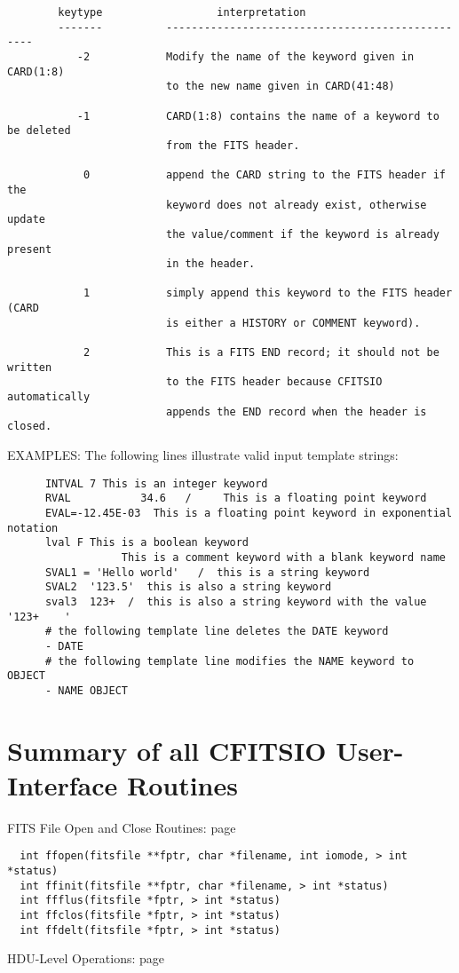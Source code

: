 \begin{verbatim}
        keytype                  interpretation
        -------          -------------------------------------------------
           -2            Modify the name of the keyword given in CARD(1:8)
                         to the new name given in CARD(41:48)

           -1            CARD(1:8) contains the name of a keyword to be deleted
                         from the FITS header.

            0            append the CARD string to the FITS header if the
                         keyword does not already exist, otherwise update
                         the value/comment if the keyword is already present
                         in the header.

            1            simply append this keyword to the FITS header (CARD
                         is either a HISTORY or COMMENT keyword).

            2            This is a FITS END record; it should not be written
                         to the FITS header because CFITSIO automatically
                         appends the END record when the header is closed.
\end{verbatim}
     EXAMPLES:  The following lines illustrate valid input template strings:

\begin{verbatim}
      INTVAL 7 This is an integer keyword
      RVAL           34.6   /     This is a floating point keyword
      EVAL=-12.45E-03  This is a floating point keyword in exponential notation
      lval F This is a boolean keyword
                  This is a comment keyword with a blank keyword name
      SVAL1 = 'Hello world'   /  this is a string keyword
      SVAL2  '123.5'  this is also a string keyword
      sval3  123+  /  this is also a string keyword with the value '123+    '
      # the following template line deletes the DATE keyword
      - DATE
      # the following template line modifies the NAME keyword to OBJECT
      - NAME OBJECT
\end{verbatim}

\chapter{   Summary of all CFITSIO User-Interface Routines }

 FITS File Open and Close Routines: page~\pageref{FFOPEN}

\begin{verbatim}
  int ffopen(fitsfile **fptr, char *filename, int iomode, > int *status)
  int ffinit(fitsfile **fptr, char *filename, > int *status)
  int ffflus(fitsfile *fptr, > int *status)
  int ffclos(fitsfile *fptr, > int *status)
  int ffdelt(fitsfile *fptr, > int *status)
\end{verbatim}
 HDU-Level Operations: page~\pageref{FFMAHD}

